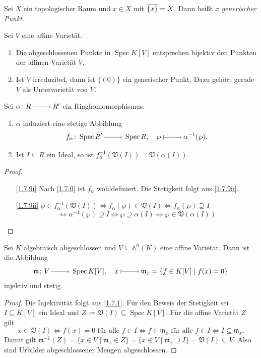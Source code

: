 \documentclass[a4paper,12pt,index=toc]{scrbook}
\theoremstyle{keinenummern} %
\def\A{\mathbb{A}}
\def\V{\mathfrak{V}}
\def\m{\mathfrak{m}}
\newcommand{\Spec}{\operatorname{Spec}}
\def\Bar#1{\ensuremath\overline{#1}}
\begin{document}
\begin{bem}\label{1.7.7}
  Sei $X$ ein topologischer Raum und $x\in X$ mit $\Bar{\{x\}}=X$. Dann heißt $x$ \emph{generischer Punkt}.
\end{bem}

\begin{bsp}\label{1.7.8}
  Sei $V$ eine affine Varietät.
  \begin{enumerate}
  \item Die abgeschlossenen Punkte in $\Spec K[V]$ entsprechen bijektiv den Punkten der affinen Varietät $V$.
  \item Ist $V$ irreduzibel, dann ist $\{(0)\}$ ein generischer Punkt. Dazu gehört gerade $V$ als Untervarietät von $V$.
  \end{enumerate}
\end{bsp}


\begin{bem}\label{1.7.9}
  Sei $\alpha\colon R\ra R'$ ein Ringhomomorphismus.
  \begin{enumerate}
  \item{} $\alpha$ induziert eine stetige Abbildung \[ f_\alpha\colon \Spec R'\ra\Spec R,\quad
    \wp\mapsto\alpha^{-1}(\wp). \]
  \item{} Ist $I\subseteq R$ ein Ideal, so ist $f_\alpha^{-1}(\V(I))=\V(\alpha(I))$.
  \end{enumerate}
\end{bem}
\begin{proof}
  \begin{enumerate}
  \item[\ref{1.7.9i}] Nach \cref{1.7.0} ist $f_\alpha$ wohldefiniert. Die Stetigkeit folgt aus \ref{1.7.9ii}.
  \item[\ref{1.7.9ii}]
      $\wp\in f_\alpha^{-1}(\V(I)) \iff f_\alpha(\wp)\in\V(I) \iff f_\alpha(\wp)\supseteq I$%
      \[\iff \alpha^{-1}(\wp)\supseteq I \iff \wp\supseteq\alpha(I) \iff \wp\in\V(\alpha(I))\]
  \end{enumerate}
\end{proof}

\begin{prop}\label{1.7.10}
  Sei $K$ algebraisch abgeschlossen und $V\subseteq\A^n(K)$ eine affine Varietät. Dann ist die Abbildung
  \[ \m\colon V\ra \Spec K[V], \quad x\mapsto \m_x=\{f\in K[V]\mid f(x)=0\} \]
  injektiv und stetig.
\end{prop}
\begin{proof}
  Die Injektivität folgt aus \cref{1.7.1}. Für den Beweis der Stetigkeit sei $I\subseteq K[V]$ ein Ideal und
  $Z:=\V(I)\subseteq\Spec K[V]$. Für die affine
  Varietät $Z$ gilt
  \[x\in\V(I) \iff f(x)=0 \text{ für alle }f\in I \iff f\in \m_x \text{ für alle }f\in I \iff I\subseteq \m_x. \]
  Damit gilt $\m^{-1}(Z)=\{x\in V\mid \m_x\in Z\}=\{x\in V\mid \m_x\supseteq I\}=\V(I)\subseteq V$. Also sind Urbilder
  abgeschlossener Mengen abgeschlossen.
\end{proof}
\end{document}
